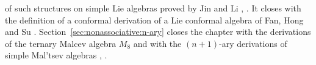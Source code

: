 of such structures on simple Lie algebras proved by Jin and Li
\cite[Definition~4, p.~18]{HartwigLarssonSilvestrov2006},
\cite[Proposition~2.2, p.~1400]{JinLi2008HomLie}. It closes with the
definition of a conformal derivation of a Lie conformal algebra of Fan,
Hong and Su \cite[Definitions~2.1 and~2.7, pp.~2--3]{FanHongSu2019}.
Section~\ref{sec:nonassociative:n-ary} closes the chapter with the
derivations of the ternary Malcev algebra $M_8$ and with the
$(n+1)$-ary derivations of simple Mal'tsev algebras
\cite[Theorem~2.3, p.~3600]{PojidaevSarahva2006},
\cite[Theorem~5, p.~581]{Kaygorodov2014n1aryMaltsev}.
